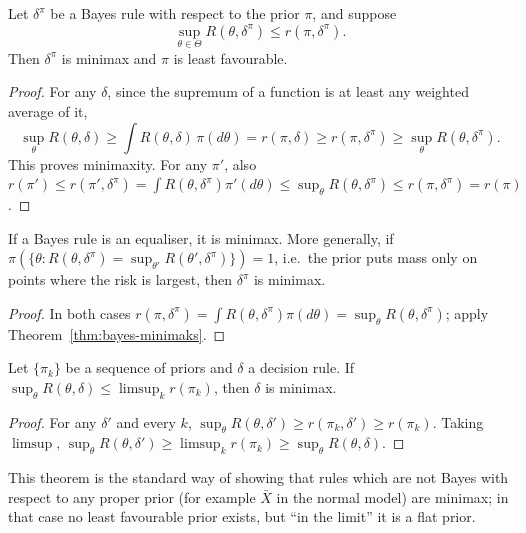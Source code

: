 \documentclass[main.tex]{subfiles}
\begin{document}
\begin{theorem}\label{thm:bayes-minimaks}
Let $\delta^\pi$ be a Bayes rule with respect to the prior $\pi$, and suppose
\[
\sup_{\theta\in\Theta}R(\theta,\delta^\pi)\le r(\pi,\delta^\pi) .
\]
Then $\delta^\pi$ is minimax and $\pi$ is least favourable.
\end{theorem}
\begin{proof}
For any $\delta$, since the supremum of a function is at least any weighted average of it,
\[
\sup_\theta R(\theta,\delta)\ge\int R(\theta,\delta)\,\pi(d\theta)=r(\pi,\delta)\ge r(\pi,\delta^\pi)\ge\sup_\theta R(\theta,\delta^\pi).
\]
This proves minimaxity. For any $\pi'$, also $r(\pi')\le r(\pi',\delta^\pi)=\int R(\theta,\delta^\pi)\pi'(d\theta)\le\sup_\theta R(\theta,\delta^\pi)\le r(\pi,\delta^\pi)=r(\pi)$.
\end{proof}

\begin{corollary}\label{cor:esitleyici-bayes}
If a Bayes rule is an equaliser, it is minimax. More generally, if $\pi(\{\theta:R(\theta,\delta^\pi)=\sup_{\theta'}R(\theta',\delta^\pi)\})=1$, i.e.\ the prior puts mass only on points where the risk is largest, then $\delta^\pi$ is minimax.
\end{corollary}
\begin{proof}
In both cases $r(\pi,\delta^\pi)=\int R(\theta,\delta^\pi)\pi(d\theta)=\sup_\theta R(\theta,\delta^\pi)$; apply Theorem~\ref{thm:bayes-minimaks}.
\end{proof}

\begin{theorem}\label{thm:limit-bayes}
Let $\{\pi_k\}$ be a sequence of priors and $\delta$ a decision rule. If $\sup_\theta R(\theta,\delta)\le\limsup_{k}r(\pi_k)$, then $\delta$ is minimax.
\end{theorem}
\begin{proof}
For any $\delta'$ and every $k$, $\sup_\theta R(\theta,\delta')\ge r(\pi_k,\delta')\ge r(\pi_k)$. Taking $\limsup$, $\sup_\theta R(\theta,\delta')\ge\limsup_kr(\pi_k)\ge\sup_\theta R(\theta,\delta)$.
\end{proof}

This theorem is the standard way of showing that rules which are not Bayes with respect to any proper prior (for example $\bar X$ in the normal model) are minimax; in that case no least favourable prior exists, but ``in the limit'' it is a flat prior.
\end{document}
